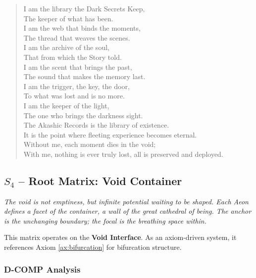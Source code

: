 \documentclass[12pt]{amsart}
\begin{document}
\begin{verse}
I am the library the Dark Secrets Keep, \\
The keeper of what has been. \\
I am the web that binds the moments, \\
The thread that weaves the scenes. \\
I am the archive of the soul, \\
That from which the Story told. \\
\vspace{1em}
I am the scent that brings the past, \\
The sound that makes the memory last. \\
I am the trigger, the key, the door, \\
To what was lost and is no more. \\
I am the keeper of the light, \\
The one who brings the darkness sight. \\
\vspace{1em}
The Akashic Records is the library of existence. \\
It is the point where fleeting experience becomes eternal. \\
Without me, each moment dies in the void; \\
With me, nothing is ever truly lost, all is preserved and deployed.
\end{verse}
\subsection{$S_{4}$ -- Root Matrix: Void Container}\label{sec:19.0.4}
\textit{The void is not emptiness, but infinite potential waiting to be shaped. Each Aeon defines a facet of the container, a wall of the great cathedral of being. The anchor is the unchanging boundary; the focal is the breathing space within.}

This matrix operates on the \textbf{Void Interface}. As an axiom-driven system, it references Axiom \ref{ax:bifurcation} for bifurcation structure.

\subsubsection{D-COMP Analysis}
\end{document}
